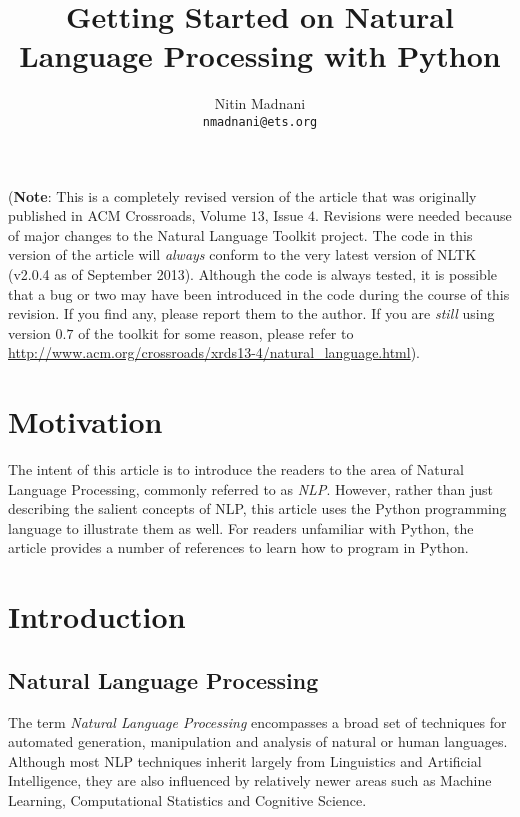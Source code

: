 \documentclass[11pt]{article}
\title{Getting Started on Natural Language Processing with Python}
\author{Nitin Madnani\\{\normalsize \tt nmadnani@ets.org}}
\date{}
\begin{document}
\maketitle
{}

\noindent (\textbf{Note}: This is a completely revised version of the article that was originally published in ACM Crossroads, Volume $13$, Issue $4$. Revisions were needed because of major changes to the Natural Language Toolkit project. The code in this version of the article will \emph{always} conform to the very latest version of NLTK (v2.0.4 as of September 2013). Although the code is always tested, it is possible that a bug or two may have been introduced in the code during the course of this revision. If you find any, please report them to the author. If you are \emph{still} using version $0.7$ of the toolkit for some reason, please refer to \url{http://www.acm.org/crossroads/xrds13-4/natural_language.html}).

\section{Motivation}\label{sec:motivation} %
The intent of this article is to introduce the readers to the area of Natural Language Processing, commonly referred to as \emph{NLP}. However, rather than just describing the salient concepts of NLP, this article uses the Python programming language to illustrate them as well. For readers unfamiliar with Python, the article provides a number of references to learn how to program in Python.

\section{Introduction}\label{sec:introduction} %
\subsection{Natural Language Processing}\label{sub:natural_language_processing} %
The term \emph{Natural Language Processing} encompasses a broad set of techniques for automated generation, manipulation and analysis of natural or human languages. Although most NLP techniques inherit largely from Linguistics and Artificial Intelligence, they are also influenced by relatively newer areas such as Machine Learning, Computational Statistics and Cognitive Science.
\end{document}
